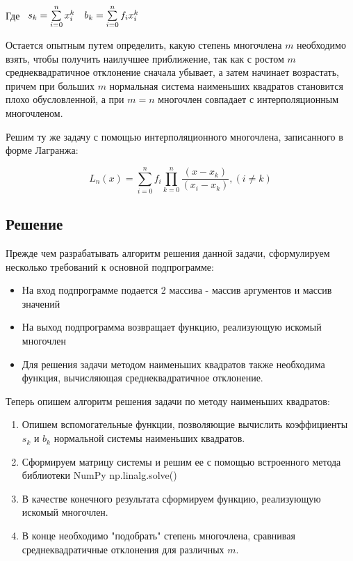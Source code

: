 Где $
\begin{array}{c c}
	s_k = \sum\limits_{i=0}^nx_i^k & b_k = \sum\limits_{i=0}^n f_ix_i^k
\end{array}
$

Остается опытным путем определить, какую степень многочлена $m$ необходимо взять, чтобы получить наилучшее приближение, так как с ростом $m$ среднеквадратичное отклонение сначала убывает, а затем начинает возрастать, причем при больших $m$ нормальная система наименьших квадратов становится плохо обусловленной, а при $m = n$ многочлен совпадает с интерполяционным многочленом.

Решим ту же задачу с помощью интерполяционного многочлена, записанного в форме Лагранжа:

\[
	L_n(x) = \sum\limits_{i=0}^n f_i \prod\limits_{k=0}^n\dfrac{(x - x_k)}{(x_i - x_k)}, (i \ne k)
\]

\subsection*{Решение}

Прежде чем разрабатывать алгоритм решения данной задачи, сформулируем несколько требований к основной подпрограмме:

\begin{itemize}
	\item На вход подпрограмме подается 2 массива - массив аргументов и массив значений
	\item На выход подпрограмма возвращает функцию, реализующую искомый многочлен
	\item Для решения задачи методом наименьших квадратов также необходима функция, вычисляющая среднеквадратичное отклонение.
\end{itemize}

Теперь опишем алгоритм решения задачи по методу наименьших квадратов:

\begin{enumerate}
	\item Опишем вспомогательные функции, позволяющие вычислить коэффициенты $s_k$ и $b_k$ нормальной системы наименьших квадратов.
	\item Сформируем матрицу системы и решим ее с помощью встроенного метода библиотеки NumPy  np.linalg.solve()
	\item В качестве конечного результата сформируем функцию, реализующую искомый многочлен.
	\item В конце необходимо "подобрать" степень многочлена, сравнивая среднеквадратичные отклонения для различных $m$.
\end{enumerate}

